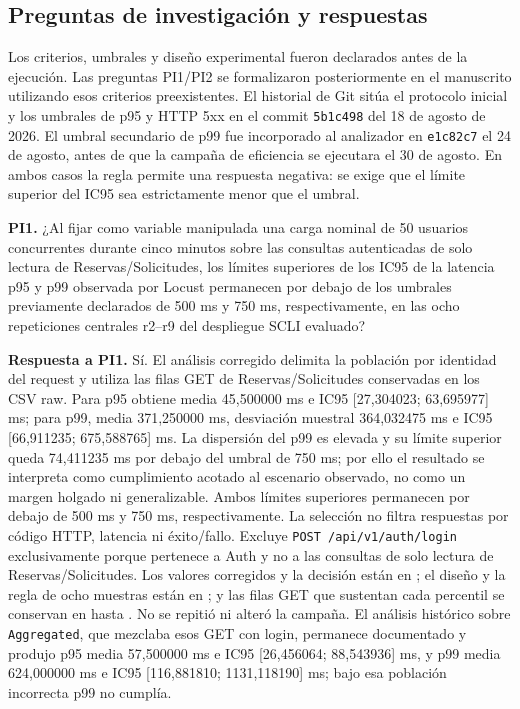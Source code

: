 \subsection{Preguntas de investigación y respuestas}
\label{subsec:preguntas-investigacion}

Los criterios, umbrales y diseño experimental fueron declarados antes de la
ejecución. Las preguntas PI1/PI2 se formalizaron posteriormente en el manuscrito
utilizando esos criterios preexistentes. El historial de Git sitúa el protocolo
inicial y los umbrales de p95 y HTTP 5xx en el commit
\texttt{5b1c498} del 18 de agosto de 2026. El umbral secundario de p99 fue
incorporado al analizador en \texttt{e1c82c7} el 24 de agosto, antes de que la
campaña de eficiencia se ejecutara el 30 de agosto. En ambos casos la regla
permite una respuesta negativa: se exige que el límite superior del IC95 sea
estrictamente menor que el umbral.

\textbf{PI1.} ¿Al fijar como variable manipulada una carga nominal de 50
usuarios concurrentes durante cinco minutos sobre las consultas autenticadas
de solo lectura de Reservas/Solicitudes, los límites superiores de los IC95 de
la latencia p95 y p99 observada por Locust permanecen por debajo de los
umbrales previamente declarados de 500 ms y 750 ms, respectivamente, en las
ocho repeticiones centrales r2--r9 del despliegue SCLI evaluado?

\textbf{Respuesta a PI1.} Sí. El análisis corregido delimita la población por
identidad del request y utiliza las filas GET de Reservas/Solicitudes conservadas
en los CSV raw. Para p95 obtiene media 45,500000 ms e IC95
[27,304023; 63,695977] ms; para p99, media 371,250000 ms, desviación muestral
364,032475 ms e IC95 [66,911235; 675,588765] ms. La dispersión del p99 es
elevada y su límite superior queda 74,411235 ms por debajo del umbral de
750 ms; por ello el resultado se interpreta como cumplimiento acotado al
escenario observado, no como un margen holgado ni generalizable. Ambos límites
superiores permanecen por debajo de 500 ms y 750 ms, respectivamente. La selección no filtra respuestas por código
HTTP, latencia ni éxito/fallo. Excluye \texttt{POST /api/v1/auth/login}
exclusivamente porque pertenece a Auth y no a las consultas de solo lectura de
Reservas/Solicitudes. Los valores corregidos y la decisión están en
; el diseño y la
regla de ocho muestras están en
; y las filas GET que sustentan cada
percentil se conservan en
hasta . No se repitió ni alteró la campaña.
El análisis histórico sobre \texttt{Aggregated}, que mezclaba esos GET con
login, permanece documentado y produjo p95 media 57,500000 ms e IC95
[26,456064; 88,543936] ms, y p99 media 624,000000 ms e IC95
[116,881810; 1131,118190] ms; bajo esa población incorrecta p99 no cumplía.

